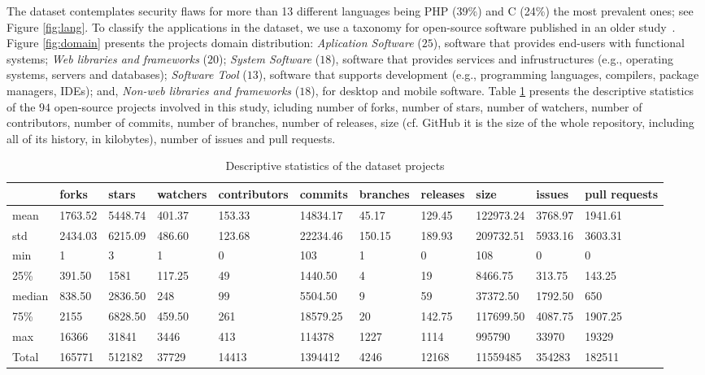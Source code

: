 \documentclass[10pt,conference]{IEEEtran}
\begin{document}
The dataset contemplates security flaws for more than 13 different languages
being PHP (39\%) and C (24\%) the most prevalent ones; see Figure \ref{fig:lang}.
To classify the applications in the dataset, we use a taxonomy for open-source
software published in an older study~\cite{7816479}. Figure \ref{fig:domain}
presents the projects domain distribution: \textit{Aplication Software} ($25$),
software that provides end-users with functional systems; \textit{Web libraries
and frameworks} ($20$); \textit{System Software} ($18$), software that provides
services and infrustructures (e.g., operating systems, servers and databases);
\textit{Software Tool} ($13$), software that supports development (e.g.,
programming languages, compilers, package managers, IDEs); and, \textit{Non-web
libraries and frameworks} ($18$), for desktop and mobile software.
%
Table \ref{tab:dataset} presents the descriptive statistics of the $94$
open-source projects involved in this study, icluding number of forks, number of
stars, number of watchers, number of contributors, number of commits, number of
branches, number of releases,  size (cf. GitHub it is the size of the whole
repository, including all of its history, in kilobytes), number of issues and pull
requests.

\begin{table}[h]
	\centering
	\caption{Descriptive statistics of the dataset projects}
\begin{tabular}{@{}lllllllllll@{}}
\toprule
      & forks   & stars   & watchers & contributors & commits  & branches & releases & size      & issues & pull requests  \\ \midrule
mean  & 1763.52 & 5448.74 & 401.37   & 153.33       & 14834.17 & 45.17    & 129.45   & 122973.24 & 3768.97   & 1941.61 \\
std   & 2434.03 & 6215.09 & 486.60   & 123.68       & 22234.46 & 150.15   & 189.93   & 209732.51 & 5933.16   & 3603.31 \\
min   & 1       & 3       & 1        & 0            & 103      & 1        & 0        & 108       & 0         & 0       \\
25\%  & 391.50  & 1581    & 117.25   & 49           & 1440.50  & 4        & 19       & 8466.75   & 313.75    & 143.25  \\
median  & 838.50  & 2836.50 & 248      & 99           & 5504.50  & 9        & 59       & 37372.50  & 1792.50   & 650     \\
75\%  & 2155    & 6828.50 & 459.50   & 261          & 18579.25 & 20       & 142.75   & 117699.50 & 4087.75   & 1907.25 \\
max   & 16366   & 31841   & 3446     & 413          & 114378   & 1227     & 1114     & 995790    & 33970     & 19329   \\
Total & 165771  & 512182  & 37729    & 14413        & 1394412  & 4246     & 12168    & 11559485  & 354283    & 182511  \\ \bottomrule
\end{tabular}
\label{tab:dataset}
\end{table}
%
\end{document}
